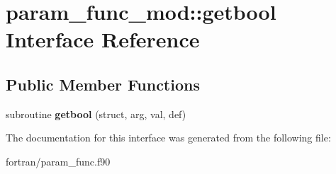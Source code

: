 \hypertarget{interfaceparam__func__mod_1_1getbool}{}\section{param\+\_\+func\+\_\+mod\+:\+:getbool Interface Reference}
\label{interfaceparam__func__mod_1_1getbool}
\subsection*{Public Member Functions}
\begin{DoxyCompactItemize}
\item 
\mbox{\label{interfaceparam__func__mod_1_1getbool_a9864711c2399a2019df56bb5ef3a13e5}} 
subroutine {\bfseries getbool} (struct, arg, val, def)
\end{DoxyCompactItemize}


The documentation for this interface was generated from the following file\+:\begin{DoxyCompactItemize}
\item 
fortran/param\+\_\+func.\+f90\end{DoxyCompactItemize}
